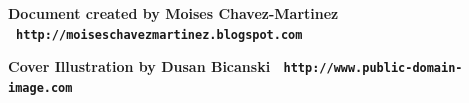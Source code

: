 \documentclass[11pt,twoside,openany,x11names,svgnames]{memoir}
\begin{document}
\cleartoverso


\enlargethispage{3\baselineskip}
\thispagestyle{empty}
\pagecolor[HTML]{0E0407}

\begin{center}
\begin{minipage}{.8\textwidth}
\color{Cornsilk}\Large\bfseries

\end{minipage}
\end{center}


\begin{center}

\vspace*{\baselineskip}

\textbf{\textcolor{LightGoldenrod!50!Gold}{Document created by Moises Chavez-Martinez \textbullet\ \texttt{http://moiseschavezmartinez.blogspot.com}}}

\vspace*{\baselineskip}

\textbf{\textcolor{LightGoldenrod}{Cover Illustration by Dusan Bicanski \textbullet\ \texttt{http://www.public-domain-image.com}}}
\end{center}
\end{document}
